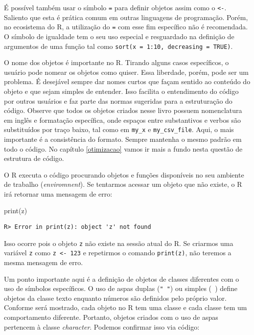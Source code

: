 \documentclass[
  11pt,
]{book}
\newenvironment{Shaded}{\begin{snugshade}}{\end{snugshade}}
\newcommand{\FunctionTok}[1]{\textcolor[rgb]{0,0,0}{#1}}
\newcommand{\NormalTok}[1]{#1}
\begin{document}
É possível também usar o símbolo \texttt{=} para definir objetos assim como o \texttt{\textless{}-}. Saliento que esta é prática comum em outras linguagens de programação. Porém, no ecosistema do R, a utilização do \texttt{=} com esse fim específico não é recomendada. O símbolo de igualdade tem o seu uso especial e resguardado na definição de argumentos de uma função tal como \texttt{sort(x\ =\ 1:10,\ decreasing\ =\ TRUE)}.

O nome dos objetos é importante no R. Tirando alguns casos específicos, o usuário pode nomear os objetos como quiser. Essa liberdade, porém, pode ser um problema. É desejável sempre dar nomes curtos que façam sentido ao conteúdo do objeto e que sejam simples de entender. Isso facilita o entendimento do código por outros usuários e faz parte das normas sugeridas para a estruturação do código. Observe que todos os objetos criados nesse livro possuem nomenclatura em inglês e formatação específica, onde espaços entre substantivos e verbos são substituídos por traço baixo, tal como em \texttt{my\_x} e \texttt{my\_csv\_file}. Aqui, o mais importante é a consistência do formato. Sempre mantenha o mesmo padrão em todo o código. No capítulo \ref{otimizacao} vamos ir mais a fundo nesta questão de estrutura de código.

O R executa o código procurando objetos e funções disponíveis no seu ambiente de trabalho (\emph{enviromnent}). Se tentarmos acessar um objeto que não existe, o R irá retornar uma mensagem de erro:

\begin{Shaded}
\begin{Highlighting}[]
\FunctionTok{print}\NormalTok{(z)}
\end{Highlighting}
\end{Shaded}

\begin{verbatim}
R> Error in print(z): object 'z' not found
\end{verbatim}

Isso ocorre pois o objeto \texttt{z} não existe na sessão atual do R. Se criarmos uma variável \texttt{z} como \texttt{z\ \textless{}-\ 123} e repetirmos o comando \texttt{print(z)}, não teremos a mesma mensagem de erro.

Um ponto importante aqui é a definição de objetos de classes diferentes com o uso de símbolos específicos. O uso de aspas duplas (\texttt{"\ "}) ou simples (\texttt{\textquotesingle{}\ \textquotesingle{}}) define objetos da classe texto enquanto números são definidos pelo próprio valor. Conforme será mostrado, cada objeto no R tem uma classe e cada classe tem um comportamento diferente. Portanto, objetos criados com o uso de aspas pertencem à classe \emph{character}. Podemos confirmar isso via código:
\end{document}
